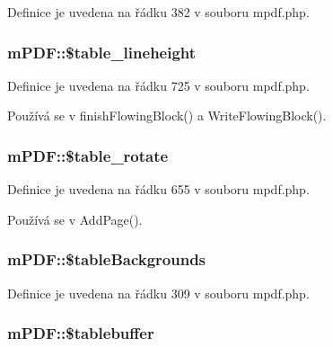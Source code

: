 Definice je uvedena na řádku 382 v souboru mpdf.\-php.

\hypertarget{classm_p_d_f_a46acbe0f355e53a533c18bbcb9015fda}{
\subsubsection[{\$table\-\_\-lineheight}]{\setlength{\rightskip}{0pt plus 5cm}m\-P\-D\-F\-::\$table\-\_\-lineheight}}\label{classm_p_d_f_a46acbe0f355e53a533c18bbcb9015fda}


Definice je uvedena na řádku 725 v souboru mpdf.\-php.



Používá se v finish\-Flowing\-Block() a Write\-Flowing\-Block().

\hypertarget{classm_p_d_f_ab9c596a8ebf573b8505982cb2bf95f2c}{
\subsubsection[{\$table\-\_\-rotate}]{\setlength{\rightskip}{0pt plus 5cm}m\-P\-D\-F\-::\$table\-\_\-rotate}}\label{classm_p_d_f_ab9c596a8ebf573b8505982cb2bf95f2c}


Definice je uvedena na řádku 655 v souboru mpdf.\-php.



Používá se v Add\-Page().

\hypertarget{classm_p_d_f_a787126423db99f5e5c94a4f173647df5}{
\subsubsection[{\$table\-Backgrounds}]{\setlength{\rightskip}{0pt plus 5cm}m\-P\-D\-F\-::\$table\-Backgrounds}}\label{classm_p_d_f_a787126423db99f5e5c94a4f173647df5}


Definice je uvedena na řádku 309 v souboru mpdf.\-php.

\hypertarget{classm_p_d_f_a16baa9e1e5961668b998e7fbe035dd48}{
\subsubsection[{\$tablebuffer}]{\setlength{\rightskip}{0pt plus 5cm}m\-P\-D\-F\-::\$tablebuffer}}\label{classm_p_d_f_a16baa9e1e5961668b998e7fbe035dd48}


